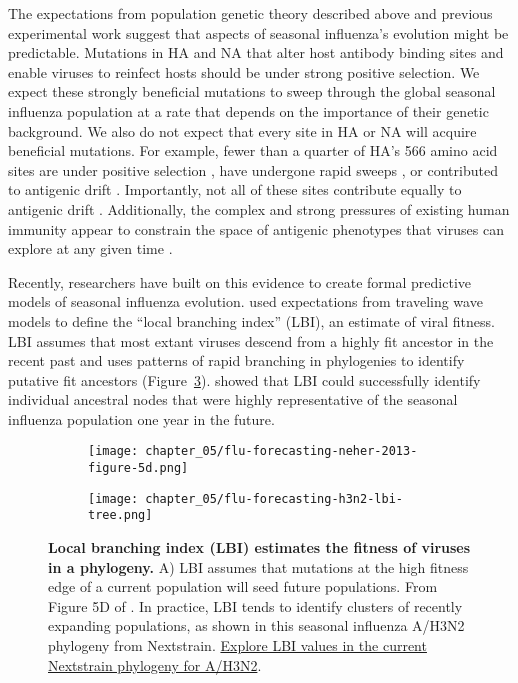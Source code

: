 The expectations from population genetic theory described above and previous experimental work suggest that aspects of seasonal influenza's evolution might be predictable.
Mutations in HA and NA that alter host antibody binding sites and enable viruses to reinfect hosts should be under strong positive selection.
We expect these strongly beneficial mutations to sweep through the global seasonal influenza population at a rate that depends on the importance of their genetic background.
We also do not expect that every site in HA or NA will acquire beneficial mutations.
For example, fewer than a quarter of HA's 566 amino acid sites are under positive selection \citep{Bush:1999vj}, have undergone rapid sweeps \citep{Shih:2007bd}, or contributed to antigenic drift \citep{Wolf:2006da}.
Importantly, not all of these sites contribute equally to antigenic drift \citep{Koel:2013jz}.
Additionally, the complex and strong pressures of existing human immunity appear to constrain the space of antigenic phenotypes that viruses can explore at any given time \citep{Smith:2004jc,Bedford2012}.

Recently, researchers have built on this evidence to create formal predictive models of seasonal influenza evolution.
\citet{Neher:2014eu} used expectations from traveling wave models to define the ``local branching index'' (LBI), an estimate of viral fitness.
LBI assumes that most extant viruses descend from a highly fit ancestor in the recent past and uses patterns of rapid branching in phylogenies to identify putative fit ancestors (Figure~\ref{fig:lbi}).
\citet{Neher:2014eu} showed that LBI could successfully identify individual ancestral nodes that were highly representative of the seasonal influenza population one year in the future.

\begin{figure}
  \centering
  \begin{subfigure}[b]{0.5\columnwidth}
    \centering
    \texttt{[image: chapter\_05/flu-forecasting-neher-2013-figure-5d.png]}
    \label{fig:lbi-theory}
  \end{subfigure}

  \begin{subfigure}[b]{0.65\columnwidth}
    \centering
    \texttt{[image: chapter\_05/flu-forecasting-h3n2-lbi-tree.png]}
    \label{fig:lbi-practice}
  \end{subfigure}

  \caption[{Local branching index (LBI) estimates the fitness of viruses in a phylogeny.}]{{\bf Local branching index (LBI) estimates the fitness of viruses in a phylogeny.}
    A) LBI assumes that mutations at the high fitness edge of a current population will seed future populations.
    From Figure 5D of \citet{Neher2013}.
    In practice, LBI tends to identify clusters of recently expanding populations, as shown in this seasonal influenza A/H3N2 phylogeny from Nextstrain.
    \href{https://nextstrain.org/flu/seasonal/h3n2/ha/2y?c=lbi}{Explore LBI values in the current Nextstrain phylogeny for A/H3N2}.
  }
  \label{fig:lbi}
\end{figure}

